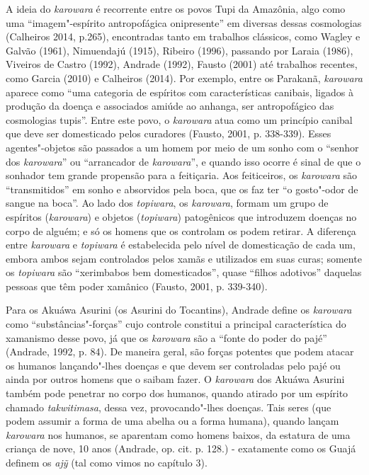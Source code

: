 A ideia do \emph{karowara} é recorrente entre os povos Tupi da Amazônia,
algo como uma ``imagem"-espírito antropofágica onipresente'' em diversas
dessas cosmologias (Calheiros 2014, p.265), encontradas tanto em
trabalhos clássicos, como Wagley e Galvão (1961), Nimuendajú (1915),
Ribeiro (1996), passando por Laraia (1986), Viveiros de Castro (1992),
Andrade (1992), Fausto (2001) até trabalhos recentes, como Garcia (2010)
e Calheiros (2014). Por exemplo, entre os Parakanã, \emph{karowara}
aparece como ``uma categoria de espíritos com características canibais,
ligados à produção da doença e associados amiúde ao anhanga, ser
antropofágico das cosmologias tupis''. Entre este povo, o \emph{karowara}
atua como um princípio canibal que deve ser domesticado pelos curadores
(Fausto, 2001, p. 338-339). Esses agentes"-objetos são passados a um
homem por meio de um sonho com o ``senhor dos \emph{karowara}'' ou
``arrancador de \emph{karowara}'', e quando isso ocorre é sinal de que o
sonhador tem grande propensão para a feitiçaria. Aos feiticeiros, os
\emph{karowara} são ``transmitidos'' em sonho e absorvidos pela boca, que
os faz ter ``o gosto"-odor de sangue na boca''. Ao lado dos
\emph{topiwara}, os \emph{karowara}, formam um grupo de espíritos
(\emph{karowara}) e objetos (\emph{topiwara}) patogênicos que introduzem
doenças no corpo de alguém; e só os homens que os controlam os podem
retirar. A diferença entre \emph{karowara} e \emph{topiwara} é
estabelecida pelo nível de domesticação de cada um, embora ambos sejam
controlados pelos xamãs e utilizados em suas curas; somente os
\emph{topiwara} são ``xerimbabos bem domesticados'', quase ``filhos
adotivos'' daquelas pessoas que têm poder xamânico (Fausto, 2001, p.
339-340).

Para os Akuáwa Asurini (os Asurini do Tocantins), Andrade define os
\emph{karowara} como ``substâncias"-forças'' cujo controle constitui a
principal característica do xamanismo desse povo, já que os
\emph{karowara} são a ``fonte do poder do pajé'' (Andrade, 1992, p. 84).
De maneira geral, são forças potentes que podem atacar os humanos
lançando"-lhes doenças e que devem ser controladas pelo pajé ou ainda por
outros homens que o saibam fazer. O \emph{karowara} dos Akuáwa Asurini
também pode penetrar no corpo dos humanos, quando atirado por um
espírito chamado \emph{takwitimasa}, dessa vez, provocando"-lhes doenças.
Tais seres (que podem assumir a forma de uma abelha ou a forma humana),
quando lançam \emph{karowara} nos humanos, se aparentam como homens
baixos, da estatura de uma criança de nove, 10 anos (Andrade, op. cit.
p. 128.) - exatamente como os Guajá definem os \emph{ajỹ} (tal como
vimos no capítulo 3).

